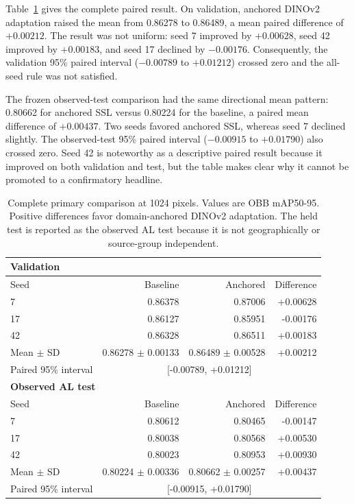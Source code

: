 \documentclass[preprint,12pt,authoryear]{elsarticle}
\newcommand{\metric}{mAP50-95}
\begin{document}
Table~\ref{tab:primary} gives the complete paired result. On validation, anchored DINOv2 adaptation raised the mean from 0.86278 to 0.86489, a mean paired difference of $+0.00212$. The result was not uniform: seed 7 improved by $+0.00628$, seed 42 improved by $+0.00183$, and seed 17 declined by $-0.00176$. Consequently, the validation 95\% paired interval ($-0.00789$ to $+0.01212$) crossed zero and the all-seed rule was not satisfied.

The frozen observed-test comparison had the same directional mean pattern: 0.80662 for anchored SSL versus 0.80224 for the baseline, a paired mean difference of $+0.00437$. Two seeds favored anchored SSL, whereas seed 7 declined slightly. The observed-test 95\% paired interval ($-0.00915$ to $+0.01790$) also crossed zero. Seed 42 is noteworthy as a descriptive paired result because it improved on both validation and test, but the table makes clear why it cannot be promoted to a confirmatory headline.

\begin{table}[H]
\centering
\caption{Complete primary comparison at 1024 pixels. Values are OBB \metric. Positive differences favor domain-anchored DINOv2 adaptation. The held test is reported as the observed AL test because it is not geographically or source-group independent.}
\label{tab:primary}
\small
\setlength{\tabcolsep}{6pt}
\begin{tabular}{lrrr}
\toprule
\multicolumn{4}{l}{\textbf{Validation}} \\
\midrule
Seed & Baseline & Anchored & Difference \\
\midrule
7  & 0.86378 & 0.87006 & +0.00628 \\
17 & 0.86127 & 0.85951 & -0.00176 \\
42 & 0.86328 & 0.86511 & +0.00183 \\
\midrule
Mean $\pm$ SD & 0.86278 $\pm$ 0.00133 & 0.86489 $\pm$ 0.00528 & +0.00212 \\
Paired 95\% interval & \multicolumn{3}{c}{[-0.00789, +0.01212]} \\
\midrule
\multicolumn{4}{l}{\textbf{Observed AL test}} \\
\midrule
Seed & Baseline & Anchored & Difference \\
\midrule
7  & 0.80612 & 0.80465 & -0.00147 \\
17 & 0.80038 & 0.80568 & +0.00530 \\
42 & 0.80023 & 0.80953 & +0.00930 \\
\midrule
Mean $\pm$ SD & 0.80224 $\pm$ 0.00336 & 0.80662 $\pm$ 0.00257 & +0.00437 \\
Paired 95\% interval & \multicolumn{3}{c}{[-0.00915, +0.01790]} \\
\bottomrule
\end{tabular}
\end{table}
\end{document}
